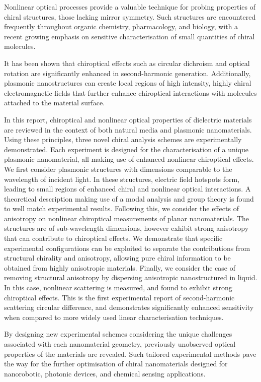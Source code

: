 Nonlinear optical processes provide a valuable technique for probing properties of chiral structures, those lacking mirror symmetry. 
Such structures are encountered frequently throughout organic chemistry, pharmacology, and biology, with a recent growing emphasis on sensitive characterisation of small quantities of chiral molecules. 
	    
It has been shown that chiroptical effects such as circular dichroism and optical rotation are significantly enhanced in second-harmonic generation. 
Additionally, plasmonic nanostructures can create local regions of high intensity, highly chiral electromagnetic fields that further enhance chiroptical interactions with molecules attached to the material surface. 
	    
In this report, chiroptical and nonlinear optical properties of dielectric materials are reviewed in the context of both natural media and plasmonic nanomaterials. 
Using these principles, three novel chiral analysis schemes are experimentally demonstrated. Each experiment is designed for the characterisation of a unique plasmonic nanomaterial, all making use of enhanced nonlinear chiroptical effects. We first consider plasmonic structures with dimensions comparable to the wavelength of incident light. In these structures, electric field hotspots form, leading to small regions of enhanced chiral and nonlinear optical interactions. A theoretical description making use of a modal analysis and group theory is found to well match experimental results. Following this, we consider the effects of anisotropy on nonlinear chiroptical measurements of planar nanomaterials. The structures are of sub-wavelength dimensions, however exhibit strong anisotropy that can contribute to chiroptical effects. We demonstrate that specific experimental configurations can be exploited to separate the contributions from structural chirality and anisotropy, allowing pure chiral information to be obtained from highly anisotropic materials. Finally, we consider the case of removing structural anisotropy by dispersing anisotropic nanostructured in liquid. In this case, nonlinear scattering is measured, and found to exhibit strong chiroptical effects. This is the first experimental report of second-harmonic scattering circular difference, and demonstrates significantly enhanced sensitivity when compared to more widely used linear characterisation techniques.

By designing new experimental schemes considering the unique challenges associated with each nanomaterial geometry, previously unobserved optical properties of the materials are revealed. Such tailored experimental methods pave the way for the further optimisation of chiral nanomaterials designed for nanorobotic, photonic devices, and chemical sensing applications.
